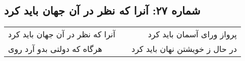 \begin{center}
\section*{شماره ۲۷: آنرا که نظر در آن جهان باید کرد}
\label{sec:027}
\begin{longtable}{l p{0.5cm} r}
آنرا که نظر در آن جهان باید کرد
&&
پرواز ورای آسمان باید کرد
\\
هرگاه که دولتی بدو آرد روی
&&
در حال ز خویشتن نهان باید کرد
\\
\end{longtable}
\end{center}
